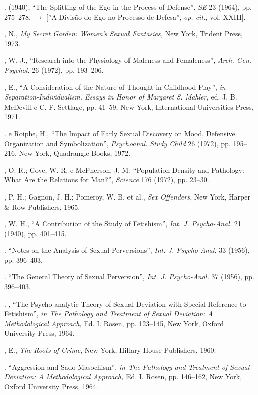 \begin{description}
. (1940), ``The Splitting of the Ego in the Process
of Defense'', \textit{SE }23 \textit{ }(1964), pp. 275--278.
{$\bm{\rightarrow}$} [''A Divisão do Ego no Processo de Defesa'', \textit{op.
cit.,} vol. XXIII].

, N., \textit{My Secret Garden: Women's Sexual
Fantasies, }New York, Trident Press, 1973.

, W. J., ``Research into the Physiology of Maleness and
Femaleness'', \textit{Arch. Gen. Psychol. }26 (1972), pp. 193--206.

, E., ``A Consideration of the Nature of Thought in
Childhood Play'', \textit{in Separation-Individualism, Essays in
Honor of Margaret S. Mahler, }ed. J. B. McDevill e C. F. Settlage, pp. 41--59, New
York, International Universities Press, 1971.

. e Roiphe, H., ``The Impact of Early Sexual
Discovery on Mood, Defensive Organization and Symbolization'',
\textit{Psychoanal. Study Child }26 (1972), pp. 195--216. New York, Quadrangle
Books, 1972.

, O. R.; Gove, W. R. e McPherson, J. M. ``Population Density
and Pathology: What Are the Relations for Man?'', \textit{Science
}176 (1972), pp. 23--30.

, P. H.; Gagnon, J. H.; Pomeroy, W. B. et al., \textit{Sex Offenders,
}New York, Harper \& Row Publishers, 1965.

, W. H., ``A Contribution of the Study of
Fetishism'', \textit{Int. J. Psycho-Anal. } 21 (1940), pp. 401--415.

. ``Notes on the Analysis of Sexual
Perversions'', \textit{Int. J. Psycho-Anal. }33 (1956), pp. 396--403.

. ``The General Theory of Sexual
Perversion'', \textit{Int. J. Psycho-Anal. }37 (1956), pp. 396--403.

. , ``The Psycho-analytic Theory of Sexual
Deviation with Special Reference to Fetishism'', \textit{in The
Pathology and Treatment of Sexual Deviation: A Methodological Approach, }Ed. I.
Rosen, pp. 123--145, New York, Oxford University Press, 1964.

, E., \textit{The Roots of Crime}, New York, Hillary House Publishers,
1960.

. ``Aggression and Sado-Masochism'',
\textit{in The Pathology and Treatment of Sexual Deviation: A Methodological
Approach, }Ed. I. Rosen, pp. 146--162, New York, Oxford University Press, 1964.


\end{description}
